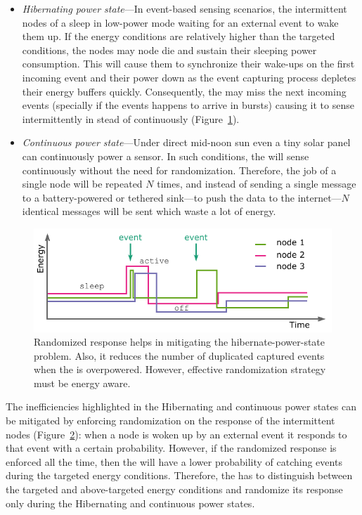 \begin{itemize}
\begin{figure}
		\label{fig:noRand}
\end{figure} 
%
		\item \label{it:hibernating} \textit{Hibernating power state}---In event-based sensing scenarios, the intermittent nodes of a \sys sleep in low-power mode waiting for an external event to wake them up. If the energy conditions are relatively higher than the targeted conditions, the nodes may node die and sustain their sleeping power consumption. This will cause them to synchronize their wake-ups on the first incoming event and their power down as the event capturing process depletes their energy buffers quickly. Consequently, the \sys may miss the next incoming events (specially if the events happens to arrive in bursts) causing it to sense intermittently in stead of continuously (Figure~\ref{fig:noRand}). 
		\item \label{it:continuous} \textit{Continuous power state}---Under direct mid-noon sun even a tiny solar panel can continuously power a sensor. In such conditions, the \sys will sense continuously without the need for randomization. Therefore, the job of a single node will be repeated $N$ times, and instead of sending a single message to a battery-powered or tethered sink---to push the data to the internet---$N$ identical messages will be sent which waste a lot of energy. 
				
\end{itemize}
%
\begin{figure}
		\centering
		\includegraphics[width=\columnwidth]{figures/randomized_response}
		\caption{Randomized response helps in mitigating the hibernate-power-state problem. Also, it reduces the number of duplicated captured events when the \sys is overpowered. However, effective randomization strategy must be energy aware.}
		\label{fig:rand}
\end{figure} 

The inefficiencies highlighted in the Hibernating and continuous power states can be mitigated by enforcing randomization on the response of the intermittent nodes (Figure~\ref{fig:rand}): when a node is woken up by an external event it responds to that event with a certain probability. However, if the randomized response is enforced all the time, then the \sys will have a lower probability of catching events during the targeted energy conditions. Therefore, the \sys has to distinguish between the targeted and above-targeted energy conditions and randomize its response only during the Hibernating and continuous power states. 

